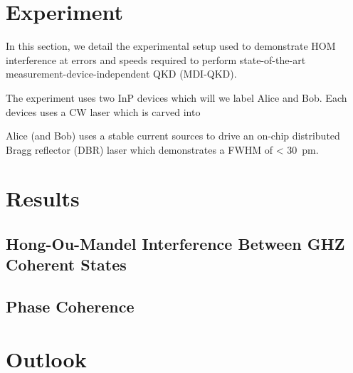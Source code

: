 \section{Experiment}

In this section, we detail the experimental setup used to demonstrate HOM interference at errors and speeds required to perform state-of-the-art measurement-device-independent QKD (MDI-QKD).

The experiment uses two InP devices which will we label Alice and Bob. Each devices uses a CW laser which is carved into  

Alice (and Bob) uses a stable current sources to drive an on-chip distributed Bragg reflector (DBR) laser which demonstrates a FWHM of < \SI{30}{\pico\metre}.

\section{Results}

\subsection{Hong-Ou-Mandel Interference Between GHZ Coherent States}

\subsection{Phase Coherence}

\section{Outlook}

